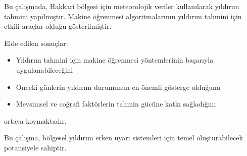 Bu çalışmada, Hakkari bölgesi için meteorolojik veriler kullanılarak yıldırım tahmini yapılmıştır. Makine öğrenmesi algoritmalarının yıldırım tahmini için etkili araçlar olduğu gösterilmiştir.

Elde edilen sonuçlar:

\begin{itemize}
    \item Yıldırım tahmini için makine öğrenmesi yöntemlerinin başarıyla uygulanabileceğini
    \item Önceki günlerin yıldırım durumunun en önemli gösterge olduğunu
    \item Mevsimsel ve coğrafi faktörlerin tahmin gücüne katkı sağladığını
\end{itemize}

ortaya koymaktadır.

Bu çalışma, bölgesel yıldırım erken uyarı sistemleri için temel oluşturabilecek potansiyele sahiptir.
